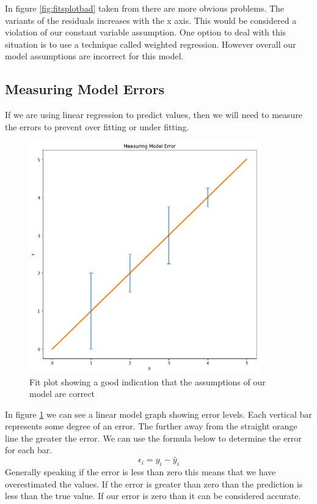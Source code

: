 In figure \ref{fig:fitsplotbad} taken \cite{heteroscedasticity} from  there are more obvious problems. The variants of the residuals increases with the x axis. This would be considered a violation of our constant variable assumption. One option to deal with this situation is to use a technique called weighted regression. However overall our model assumptions are incorrect for this model.

\subsection{Measuring Model Errors}

If we are using linear regression to predict values, then we will need to measure the errors to prevent over fitting or under fitting.
\begin{figure}[H]
  \centering
  \includegraphics[scale=0.5,width=100mm]{./images/graph-error-bars.png}
  \caption{Fit plot showing a good indication that the assumptions of our model are correct}
  \label{fig:graph-error-bars}
\end{figure}
In figure \ref{fig:graph-error-bars} we can see a linear model graph showing error levels. Each vertical bar represents some degree of an error. The further away from the straight orange line the greater the error. We can use the formula below to determine the error for each bar.
\begin{equation}
    \epsilon_i = y_i - \hat y_i
\end{equation}
Generally speaking if the error is less than zero this means that we have overestimated the values. If the error is greater than zero than the prediction is less than the true value. If our error is zero than it can be considered accurate.

